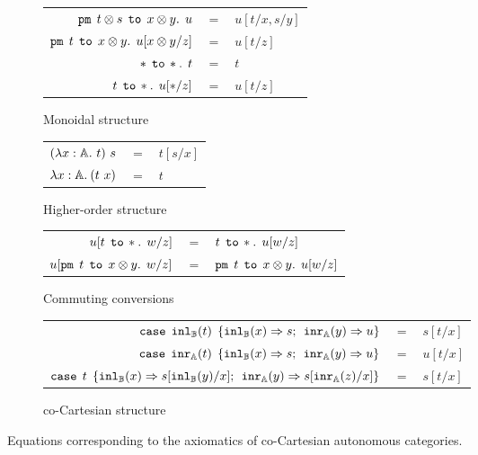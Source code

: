\documentclass[submission,copyright,creativecommons]{eptcs}
\begin{document}
\begin{figure}[h!]
  \begin{subfigure}[large]{0.6\textwidth}
  \begin{tabular}{r c l}
        $\mathtt{pm} \> \> t \otimes s \> \> \mathtt{to} \> \> x \otimes y. \> \> u$ &
        $=$ & $u[t/x,s/y]$ \\
        $\mathtt{pm} \> \> t \> \> \mathtt{to} \> \> x \otimes y. \> \> u[x \otimes y / z]$ &
        $=$ & $u[t/z]$ \\
        $\ast \> \> \mathtt{to} \, \ast. \> \> t$ & $=$ & $t$ \\
        $t \> \> \mathtt{to} \, \ast. \> \> u[\ast/ z]$ & $=$ & $u[t/z]$
  \end{tabular}
  \caption{Monoidal structure}
  \end{subfigure}
  \vspace{0.5cm}
  \begin{subfigure}{0.3\textwidth}
  \begin{tabular}{r c l}
        $(\lambda x : \mathbb{A} .\ t)\ s$ &$=$& $t[s/x]$ \\
        $\lambda x : \mathbb{A}. \> (t\ x)$ &$=$& $t$
  \end{tabular}
  \caption{Higher-order structure}
  \end{subfigure}
  \begin{subfigure}{1\textwidth}
  \centering
  \begin{tabular}{r c l}
        $u[t \> \> \mathtt{to} \, \ast. \> \> w/z]$ &$=$& $t \> \> \mathtt{to} \, \ast. \> \> u[w/z]$ \\
        $u[\mathtt{pm} \> \> t \> \> \mathtt{to} \> \> x \otimes y. \> \> w/z]$ &$=$& $\mathtt{pm} \> \> t \> \> \mathtt{to} \> \> x \otimes y. \> \> u[w/z]$
  \end{tabular}
  \caption{Commuting conversions}
  \end{subfigure}
  \begin{subfigure}{1\textwidth}
  \vspace{0.25cm}
  
  \dotfill

  \vspace{0.25cm}

  \centering
  \begin{tabular}{r c l}
          $\mathtt{case} \> \> \mathtt{inl}_{\mathbb{B}} (t) \> \> \{ \mathtt{inl}_{\mathbb{B}} (x) \Rightarrow s ; \>\> \mathtt{inr}_{\mathbb{A}} (y) \Rightarrow u \}$
          & $=$
          &
          $s[t/x]$
          \\
          $\mathtt{case} \> \> \mathtt{inr}_{\mathbb{A}} (t) \> \> \{ \mathtt{inl}_{\mathbb{B}} (x) \Rightarrow s ; \>\> \mathtt{inr}_{\mathbb{A}} (y) \Rightarrow u \}$
          & $=$
          &
          $u[t/x]$
          \\
          $\mathtt{case} \> \> t \> \> \{ \mathtt{inl}_{\mathbb{B}} (x) \Rightarrow s[\mathtt{inl}_{\mathbb{B}} (y)/x] ; \>\> \mathtt{inr}_{\mathbb{A}} (y) \Rightarrow s[\mathtt{inr}_{\mathbb{A}} (z)/x] \}$
          & $=$
          &
          $s[t/x]$
  \end{tabular}
  \caption{co-Cartesian structure}
  \end{subfigure}
  \caption{Equations corresponding to the axiomatics of co-Cartesian autonomous categories.}
  \label{fig:eqs}
\end{figure}
\end{document}
